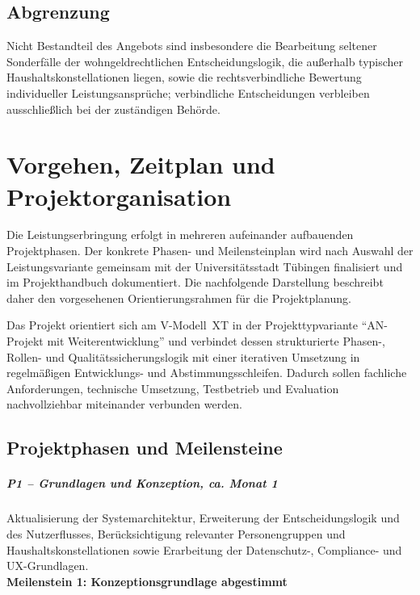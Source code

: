 \documentclass[11pt,a4paper,openany]{report}
\let\origparagraph\paragraph
\renewcommand{\paragraph}[1]{\needspace{4\baselineskip}\origparagraph{#1}}
\begin{document}
\section{Abgrenzung}

Nicht Bestandteil des Angebots sind insbesondere die Bearbeitung seltener
Sonderfälle der wohngeldrechtlichen Entscheidungslogik, die außerhalb
typischer Haushaltskonstellationen liegen, sowie die rechtsverbindliche
Bewertung individueller Leistungsansprüche; verbindliche Entscheidungen
verbleiben ausschließlich bei der zuständigen Behörde.

\chapter{Vorgehen, Zeitplan und Projektorganisation}

Die Leistungserbringung erfolgt in mehreren aufeinander aufbauenden
Projektphasen. Der konkrete Phasen- und Meilensteinplan wird nach Auswahl
der Leistungsvariante gemeinsam mit der Universitätsstadt Tübingen
finalisiert und im Projekthandbuch dokumentiert. Die nachfolgende
Darstellung beschreibt daher den vorgesehenen Orientierungsrahmen für
die Projektplanung.

Das Projekt orientiert sich am V-Modell~XT in der Projekttypvariante
\enquote{AN-Projekt mit Weiterentwicklung} und verbindet dessen
strukturierte Phasen-, Rollen- und Qualitätssicherungslogik mit einer
iterativen Umsetzung in regelmäßigen Entwicklungs- und
Abstimmungsschleifen. Dadurch sollen fachliche Anforderungen, technische
Umsetzung, Testbetrieb und Evaluation nachvollziehbar miteinander
verbunden werden.

\section{Projektphasen und Meilensteine}

\paragraph{P1 -- Grundlagen und Konzeption, ca. Monat 1}
Aktualisierung der Systemarchitektur, Erweiterung der Entscheidungslogik
und des Nutzerflusses, Berücksichtigung relevanter Personengruppen und
Haushaltskonstellationen sowie Erarbeitung der Datenschutz-, Compliance-
und UX-Grundlagen.\\
\textbf{Meilenstein 1: Konzeptionsgrundlage abgestimmt}
\end{document}
